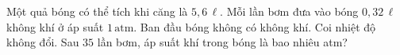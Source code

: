 

\begin{ex}
Một quả bóng có thể tích khi căng là $5,6\,\ell$. Mỗi lần bơm đưa vào bóng $0,32\,\ell$ không khí ở áp suất $1\,\text{atm}$. Ban đầu bóng không có không khí. Coi nhiệt độ không đổi. Sau $35$ lần bơm, áp suất khí trong bóng là bao nhiêu atm?
\end{ex}
